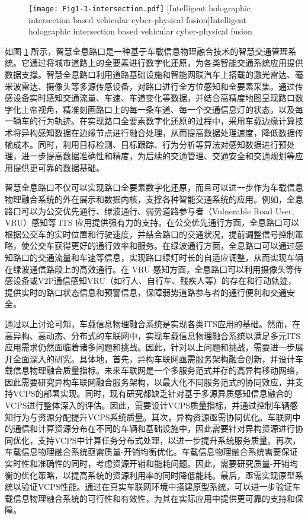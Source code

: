 \begin{figure}[h] 
	\centering
	\texttt{[image: Fig1-3-intersection.pdf]}
	[Intelligent holographic intersection based vehicular cyber-physical fusion]{Intelligent holographic intersection based vehicular cyber-physical fusion}
	\label{fig 1-3}
\end{figure}

如图 \ref{fig 1-3} 所示，智慧全息路口是一种基于车载信息物理融合技术的智慧交通管理系统。它通过将城市道路上的全要素进行数字化还原，为各类智能交通系统应用提供数据支撑。智慧全息路口利用道路基础设施和智能网联汽车上搭载的激光雷达、毫米波雷达、摄像头等多源传感设备，对路口进行全方位感知和全要素采集。通过传感设备实时感知交通流量、车速、车道变化等数据，并结合高精度地图呈现路口数字化上帝视角，精准刻画路口上的每一条车道、每一个交通信息灯的状态，以及每一辆车的行为轨迹。在实现路口全要素数字化还原的过程中，采用车载边缘计算技术将异构感知数据在边缘节点进行融合处理，从而提高数据处理速度，降低数据传输成本。同时，利用目标检测、目标跟踪、行为分析等算法对感知数据进行预处理，进一步提高数据准确性和精度，为后续的交通管理、交通安全和交通规划等应用提供更可靠的数据基础。

智慧全息路口不仅可以实现路口全要素数字化还原，而且可以进一步作为车载信息物理融合系统的外在展示和数据内核，支撑各种智能交通系统的应用。例如，全息路口可以为公交优先通行、绿波通行、弱势道路参与者（Vulnerable Road User, VRU）感知等 ITS 应用提供强有力的支持。在公交优先通行方面，全息路口可以根据公交车的实时位置和行驶速度，并结合路口的交通状况，提前调整信号控制策略，使公交车获得更好的通行效率和服务。在绿波通行方面，全息路口可以通过感知路口的交通流量和车速等信息，实现路口绿灯时长的自适应调整，从而实现车辆在绿波通信路段上的高效通行。在 VRU 感知方面，全息路口可以利用摄像头等传感设备或V2P通信感知VRU（如行人、自行车、残疾人等）的存在和行动轨迹，提供实时的路口状态信息和预警信息，保障弱势道路参与者的通行便利和交通安全。

通过以上讨论可知，车载信息物理融合系统是实现各类ITS应用的基础。然而，在高异构、高动态、分布式的车联网中，实现车载信息物理融合系统以满足多元ITS应用需求仍然面临着诸多问题和挑战。因此，针对以上问题和挑战，需要进一步展开全面深入的研究。具体地，首先，异构车联网亟需服务架构融合创新，并设计车载信息物理融合质量指标。未来车联网是一个多服务范式并存的高异构移动网络，因此需要研究异构车联网融合服务架构，以最大化不同服务范式的协同效应，并支持VCPS的部署实现。同时，现有研究都缺乏针对基于多源异质感知信息融合的VCPS进行整体深入的评估。因此，需要设计VCPS质量指标，并通过控制车辆感知行为与资源分配提升VCPS系统质量。其次，异构资源亟需协同优化。车联网中的通信和计算资源分布在不同的车辆和基础设施中，因此需要针对异构资源进行协同优化，支持VCPS中计算任务分布式处理，以进一步提升系统服务质量。再次，车载信息物理融合系统亟需质量-开销均衡优化。车载信息物理融合系统需要保证实时性和准确性的同时，考虑资源开销和能耗问题。因此，需要研究质量-开销均衡的优化策略，以提高系统的资源利用率的同时降低能耗。最后，亟需实现原型系统以验证VCPS性能。通过在真实车联网环境中搭建原型系统，可以进一步验证车载信息物理融合系统的可行性和有效性，为其在实际应用中提供更可靠的支持和保障。

